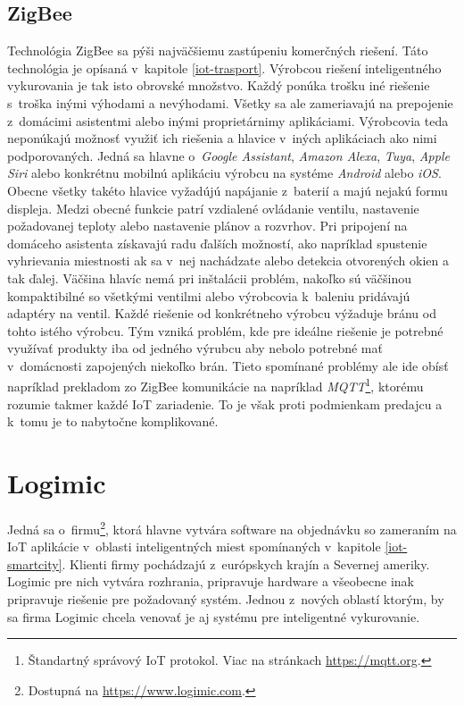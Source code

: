 \subsection*{ZigBee}
Technológia ZigBee sa pýši najväčšiemu zastúpeniu komerčných riešení. 
Táto technológia je opísaná v~kapitole \ref{iot-trasport}. 
Výrobcou riešení inteligentného vykurovania je tak isto obrovské množstvo. 
Každý ponúka trošku iné riešenie s~troška inými výhodami a nevýhodami. 
Všetky sa ale zameriavajú na prepojenie z~domácimi asistentmi alebo inými proprietárnimy aplikáciami.
Výrobcovia teda neponúkajú možnosť využiť ich riešenia a hlavice v~iných aplikáciach ako nimi podporovaných. 
Jedná sa hlavne o~\emph{Google Assistant}, \emph{Amazon Alexa}, \emph{Tuya}, \emph{Apple Siri} alebo konkrétnu mobilnú aplikáciu výrobcu na systéme \emph{Android} alebo \emph{iOS}. 
Obecne všetky takéto hlavice vyžadújú napájanie z~baterií a majú nejakú formu displeja. 
Medzi obecné funkcie patrí vzdialené ovládanie ventilu, nastavenie požadovanej teploty alebo nastavenie plánov a rozvrhov. 
Pri pripojení na domáceho asistenta získavajú radu ďalších možností, ako napríklad spustenie vyhrievania miestnosti ak sa v~nej nachádzate alebo detekcia otvorených okien a tak ďalej. 
Väčšina hlavíc nemá pri inštalácii problém, nakoľko sú väčšinou kompaktibilné so všetkými ventilmi alebo výrobcovia k~baleniu pridávajú adaptéry na ventil.
Každé riešenie od konkrétneho výrobcu výžaduje bránu od tohto istého výrobcu. 
Tým vzniká problém, kde pre ideálne riešenie je potrebné využívať produkty iba od jedného výrubcu aby nebolo potrebné mať v~domácnosti zapojených niekoľko brán. 
Tieto spomínané problémy ale ide obísť napríklad prekladom zo ZigBee komunikácie na napríklad \emph{MQTT}\footnote{Štandartný správový IoT protokol. Viac na stránkach \url{https://mqtt.org}.}, ktorému rozumie takmer každé IoT zariadenie. 
To je však proti podmienkam predajcu a k~tomu je to nabytočne komplikované.

\section{Logimic}\label{Logimic}
Jedná sa o~firmu\footnote{Dostupná na \url{https://www.logimic.com}.}, ktorá hlavne vytvára software na objednávku so zameraním na IoT aplikácie v~oblasti inteligentných miest spomínaných v~kapitole \ref{iot-smartcity}.
Klienti firmy pochádzajú z~európskych krajín a Severnej ameriky. 
Logimic pre nich vytvára rozhrania, pripravuje hardware a všeobecne inak pripravuje riešenie pre požadovaný systém. 
Jednou z~nových oblastí ktorým, by sa firma Logimic chcela venovať je aj systému pre inteligentné vykurovanie.

